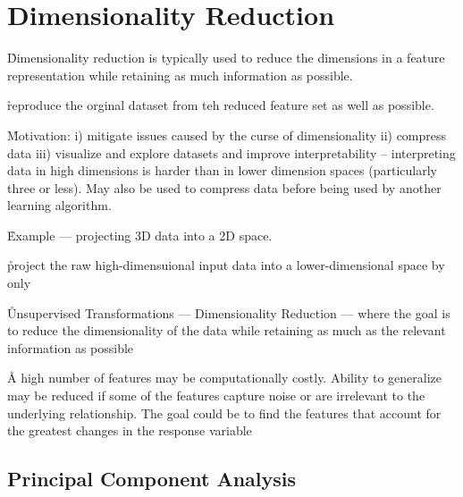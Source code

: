\section{Dimensionality Reduction}
\label{unsupervised_dimensionality_reduction}

\r{Dimensionality reduction is typically used to reduce the dimensions in a feature representation while retaining as much information as possible.}

\r{reproduce the orginal dataset from teh reduced feature set as well as possible.}

\r{Motivation: i) mitigate issues caused by the curse of dimensionality ii) compress data iii) visualize and explore datasets and improve interpretability -- interpreting data in high dimensions is harder than in lower dimension spaces (particularly three or less). May also be used to compress data before being used by another learning algorithm.}

\r{Example --- projecting 3D data into a 2D space.}

\r{project the raw high-dimensuional input data into  a lower-dimensional space by only }


\r{Unsupervised Transformations --- Dimensionality Reduction --- where the goal is to reduce the dimensionality of the data while retaining as much as the relevant information as possible}


\r{A high number of features may be computationally costly. Ability to generalize may be reduced if some of the features capture noise or are irrelevant to the underlying relationship. The goal could be to find the features that account for the greatest changes in the response variable}



\subsection{Principal Component Analysis}

